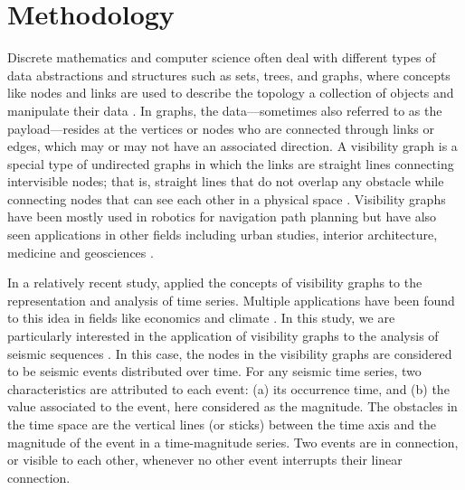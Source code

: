 
\section{Methodology}

Discrete mathematics and computer science often deal with different types of data abstractions and structures such as sets, trees, and graphs, where concepts like nodes and links are used to describe the topology a collection of objects and manipulate their data \citep[e.g.,][]{Skiena_2008_Book}. In graphs, the data---sometimes also referred to as the payload---resides at the vertices or nodes who are connected through links or edges, which may or may not have an associated direction. A visibility graph is a special type of undirected graphs in which the links are straight lines connecting intervisible nodes; that is, straight lines that do not overlap any obstacle while connecting nodes that can see each other in a physical space \citet{LozanoPerez_1979_CACM}. Visibility graphs have been mostly used in robotics for navigation path planning \citep[e.g.,][]{Huang_2004_Proc, Oommen_1987_JRA} but have also seen applications in other fields including urban studies, interior architecture, medicine and geosciences \citep[e.g.,][]{Raman_2010_UE, Ahmadlou_2010_JNT, Varoudis_2014_JSS, Phillips_2015_ESR}.

In a relatively recent study, \citet{Lacasa2008} applied the concepts of visibility graphs to the representation and analysis of time series. Multiple applications have been found to this idea in fields like economics \citep{Yang_2009_PA, Wang2012} and climate \citep{Elsner_2009_GRL}. In this study, we are particularly interested in the application of visibility graphs to the analysis of seismic sequences \citep{Telesca2012}. In this case, the nodes in the visibility graphs are considered to be seismic events distributed over time. For any seismic time series, two characteristics are attributed to each event: (a) its occurrence time, and (b) the value associated to the event, here considered as the magnitude. The obstacles in the time space are the vertical lines (or sticks) between the time axis and the magnitude of the event in a time-magnitude series. Two events are in connection, or visible to each other, whenever no other event interrupts their linear connection.

